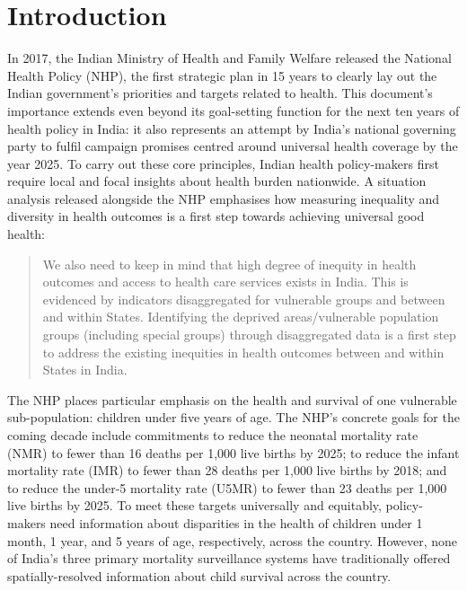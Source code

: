 \documentclass[
]{report}
\begin{document}
\hypertarget{introduction-3}{%
\section{Introduction}\label{introduction-3}}

In 2017, the Indian Ministry of Health and Family Welfare released the National Health Policy (NHP), the first strategic plan in 15 years to clearly lay out the Indian government's priorities and targets related to health.\autocite{IND_MOHFW2017} This document's importance extends even beyond its goal-setting function for the next ten years of health policy in India: it also represents an attempt by India's national governing party to fulfil campaign promises centred around universal health coverage by the year 2025.\autocite{Sundararaman2017} To carry out these core principles, Indian health policy-makers first require local and focal insights about health burden nationwide. A situation analysis released alongside the NHP emphasises how measuring inequality and diversity in health outcomes is a first step towards achieving universal good health:

\begin{quote}
We also need to keep in mind that high degree of inequity in health outcomes and access to health care services exists in India. This is evidenced by indicators disaggregated for vulnerable groups and between and within States. Identifying the deprived areas/vulnerable population groups (including special groups) through disaggregated data is a first step to address the existing inequities in health outcomes between and within States in India.\autocite{IND_MOHFW2017a}
\end{quote}

The NHP places particular emphasis on the health and survival of one vulnerable sub-population: children under five years of age. The NHP's concrete goals for the coming decade include commitments to reduce the neonatal mortality rate (NMR) to fewer than 16 deaths per 1,000 live births by 2025; to reduce the infant mortality rate (IMR) to fewer than 28 deaths per 1,000 live births by 2018; and to reduce the under-5 mortality rate (U5MR) to fewer than 23 deaths per 1,000 live births by 2025. To meet these targets universally and equitably, policy-makers need information about disparities in the health of children under 1 month, 1 year, and 5 years of age, respectively, across the country. However, none of India's three primary mortality surveillance systems have traditionally offered spatially-resolved information about child survival across the country.
\end{document}
